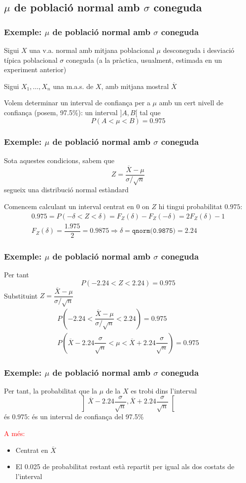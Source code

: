 \documentclass[12pt,t]{beamer}
\newcommand{\red}[1]{\textcolor{red}{#1}}
\renewcommand{\emph}[1]{{\color{red}#1}}
\theoremstyle{plain}
\theoremstyle{definition}
\begin{document}
\subsection{$\mu$ de població normal amb $\sigma$ coneguda}
\begin{frame}
\frametitle{Exemple: $\mu$ de població normal amb $\sigma$ coneguda}

Sigui $X$ una v.a. normal amb mitjana poblacional $\mu$ desconeguda i desviació típica poblacional $\sigma$ coneguda (a la pràctica, usualment, \emph{estimada en un experiment anterior})
\medskip

Sigui $X_1,\ldots,X_n$ una m.a.s. de $X$, amb mitjana mostral $\overline{X}$
\medskip

Volem determinar un interval de confiança per a $\mu$ amb un cert nivell de confiança (posem, 97.5\%):  un interval $]A,B[$ tal que
$$
P(A<\mu<B)=0.975
$$


\end{frame}

\begin{frame}
\frametitle{Exemple: $\mu$ de població normal amb $\sigma$ coneguda}

Sota aquestes condicions, sabem que
$$
Z=\frac{\overline{X}-\mu}{\sigma/\sqrt{n}}
$$
segueix una distribució normal estàndard
\medskip

Comencem calculant un interval centrat en $0$ on  $Z$ hi
tingui probabilitat $0.975$:
$$
\begin{array}{l}
0.975\!=\! P(-\delta<Z<\delta)\!=\!F_{Z}(\delta)\!-\!F_{Z}(-\delta)\!=\!
2 F_{Z}(\delta)\!-\!1\\[2ex]
F_{Z}(\delta)=\dfrac{1.975}{2}=0.9875\Rightarrow
\delta=\texttt{qnorm(0.9875)}=2.24
\end{array}
$$
\end{frame}


\begin{frame}
\frametitle{Exemple: $\mu$ de població normal amb $\sigma$ coneguda}
Per tant
$$
P(-2.24<Z<2.24)=0.975
$$
Substituint $Z=\dfrac{\overline{X}-\mu}{\sigma/\sqrt{n}}$
$$
\begin{array}{c}
P\left(-2.24<\dfrac{\overline{X}-\mu}{\sigma/\sqrt{n}}
<2.24\right)=0.975\\[3ex]
P\left(\overline{X} -2.24 \dfrac{\sigma}{\sqrt{n}}< \mu< \overline{X}+
2.24\dfrac{\sigma}{\sqrt{n}}\right)=0.975
\end{array}
$$
\end{frame}
\begin{frame}
\frametitle{Exemple: $\mu$ de població normal amb $\sigma$ coneguda}
Per tant, la probabilitat que la $\mu$ de la $X$ es trobi dins l'interval
$$
\left]\overline{X} -2.24 \frac{\sigma}{\sqrt{n}},
\overline{X}+ 2.24\frac{\sigma}{\sqrt{n}}
\right[
$$
és $0.975$: és un interval de confiança del 97.5\%
\medskip

\red{A més:}
\begin{itemize}
\item Centrat en $\overline{X}$
\medskip

\item El 0.025 de probabilitat restant està repartit per igual als dos costats de l'interval
\end{itemize}
\end{frame}
\end{document}
